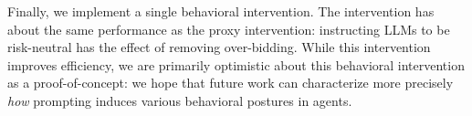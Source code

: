\documentclass{article} %
\newcommand{\kibitz}[2]{\ifnum\Comments=1{\color{#1}{#2}}\fi}
\newcommand{\dcp}[1]{\kibitz{teal}{[DCP: #1]}}
\begin{document}
Finally, we implement a single behavioral intervention. 
The intervention has about the same performance as the proxy intervention: instructing LLMs to be risk-neutral has the effect of removing over-bidding. 
While this intervention improves efficiency, we are primarily optimistic about this behavioral intervention as a proof-of-concept: we hope that future work can characterize more precisely \textit{how} prompting induces various behavioral postures in agents.

\end{document}
